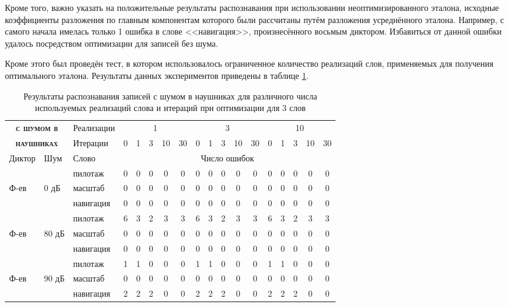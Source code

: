 Кроме того, важно указать на положительные результаты распознавания при использовании неоптимизированного эталона, исходные коэффициенты разложения по главным компонентам которого были рассчитаны путём разложения усреднённого эталона.
Например, с самого начала имелась только 1 ошибка в слове <<навигация>>, произнесённого восьмым диктором.
Избавиться от данной ошибки удалось посредством оптимизации для записей без шума.

Кроме этого был проведён тест, в котором использовалось ограниченное количество реализаций слов, применяемых для получения оптимального эталона.
Результаты данных экспериментов приведены в таблице \ref{tab:subsect3_3_3_tab3}.

\begin{table}[h]
	\centering
	\caption{Результаты распознавания записей с шумом в наушниках для различного числа используемых реализаций слова и итераций при оптимизации для 3 слов}
	\label{tab:subsect3_3_3_tab3}
	{\small
		\begin{tabular}{ | l | l | l | c | c | c | c | c || c | c | c | c | c || c | c | c | c | c |}
			\hline
			\multicolumn{2}{|c|}{\textbf{\textsc{с шумом в}}} & Реализации & \multicolumn{5}{c||}{1} & \multicolumn{5}{c||}{3} & \multicolumn{5}{c|}{10} \\
			\cline{3-18}
			\multicolumn{2}{|c|}{\textbf{\textsc{\phantom{0}наушниках\phantom{0}}}} & Итерации & 0 & 1 & 3 & 10 & 30 & 0 & 1 & 3 & 10 & 30 & 0 & 1 & 3 & 10 & 30  \\
			\hline
			Диктор 	& Шум 	& Слово 	& \multicolumn{15}{c|}{Число ошибок}	\\
			\hline
					& 		& пилотаж 	& 0  & 0  & 0  & 0  & 0    & 0  & 0  & 0  & 0  & 0    & 0  & 0  & 0  & 0  & 0  \\
			Ф-ев	& 0 дБ	& масштаб 	& 0  & 0  & 0  & 0  & 0    & 0  & 0  & 0  & 0  & 0    & 0  & 0  & 0  & 0  & 0  \\
					& 		& навигация & 0  & 0  & 0  & 0  & 0    & 0  & 0  & 0  & 0  & 0    & 0  & 0  & 0  & 0  & 0  \\
			\hline
					& 		& пилотаж 	& 6  & 3  & 2  & 3  & 3    & 6  & 3  & 2  & 3  & 3    & 6  & 3  & 2  & 3  & 3  \\
			Ф-ев	& 80 дБ	& масштаб 	& 0  & 0  & 0  & 0  & 0    & 0  & 0  & 0  & 0  & 0    & 0  & 0  & 0  & 0  & 0  \\
					& 		& навигация & 0  & 0  & 0  & 0  & 0    & 0  & 0  & 0  & 0  & 0    & 0  & 0  & 0  & 0  & 0  \\
			\hline
					& 		& пилотаж 	& 1  & 1  & 0  & 0  & 0    & 1  & 1  & 0  & 0  & 0    & 1  & 1  & 0  & 0  & 0  \\
			Ф-ев  & 90 дБ	& масштаб 	& 0  & 0  & 0  & 0  & 0    & 0  & 0  & 0  & 0  & 0    & 0  & 0  & 0  & 0  & 0  \\
					& 		& навигация & 2  & 2  & 2  & 0  & 0    & 2  & 2  & 2  & 0  & 0    & 2  & 2  & 2  & 0  & 0  \\
			\hline
		\end{tabular}
	}
\end{table}

